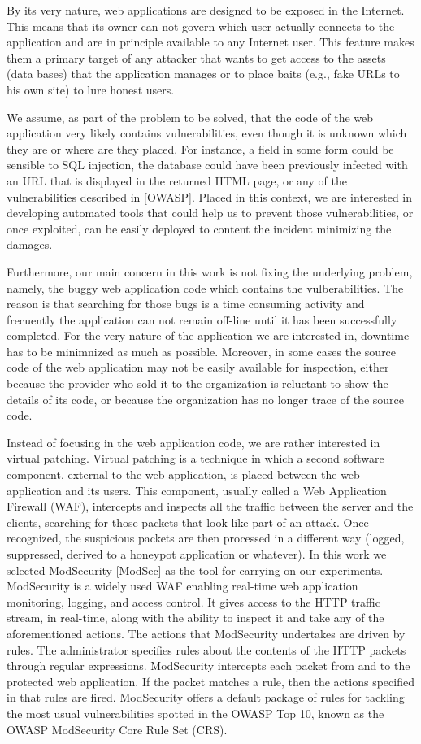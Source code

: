 \documentclass[runningheads,a4paper]{llncs}
\begin{document}
By its very nature, web applications are designed to be exposed in the Internet. This means that its owner can not govern which user actually connects to the application and are in principle available to any Internet user. This feature makes them a primary target of any attacker that wants to get access to the assets (data bases) that the application manages or to place baits (e.g., fake URLs to his own site) to lure honest users.


We assume, as part of the problem to be solved, that the code of the web application very likely contains vulnerabilities, even though it is unknown which they are or where are they placed. For instance, a field in some form could be sensible to SQL injection, the database could have been previously infected with an URL that is displayed in the returned HTML page, or any of the vulnerabilities described in [OWASP]. Placed in this context, we are interested in developing automated tools that could help us to prevent those vulnerabilities, or once exploited, can be easily deployed to content the incident minimizing the damages. 

Furthermore, our main concern in this work is not fixing the underlying problem, namely, the buggy web application code which contains the vulberabilities. The reason is that searching for those bugs is a time consuming activity and frecuently the application can not remain off-line until it has been successfully completed. For the very nature of the application we are interested in, downtime has to be minimnized as much as possible. Moreover, in some cases the source code of the web application may not be easily available for inspection, either because the provider who sold it to the organization is reluctant to show the details of its code, or because the organization has no longer trace of the source code.

Instead of focusing in the web application code, we are rather interested in virtual patching. Virtual patching is a technique in which a second software component, external to the web application, is placed between the web application and its users. This component, usually called a Web Application Firewall (WAF), intercepts and inspects all the traffic between the server and the clients, searching for those packets that look like part of an attack. Once recognized, the suspicious packets are then processed in a different way (logged, suppressed, derived to a honeypot application or whatever). In this work we selected ModSecurity [ModSec] as the tool for carrying on our experiments. ModSecurity is a widely used WAF enabling real-time web application monitoring, logging, and access control. It gives access to the HTTP traffic stream, in real-time, along with the ability to inspect it and take any of the aforementioned actions. 
The actions that ModSecurity undertakes are driven by rules. The administrator specifies rules about the contents of the HTTP packets through regular expressions. ModSecurity intercepts each packet from and to the protected web application. If the packet matches a rule, then the actions specified in that rules are fired. ModSecurity offers a default package of rules for tackling the most usual vulnerabilities spotted in the OWASP Top 10, known as the OWASP ModSecurity Core Rule Set (CRS). 
\end{document}

